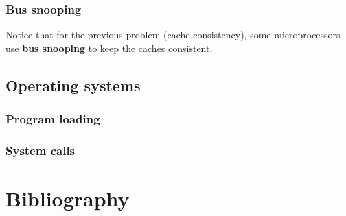 
\begin{frame}
  \frametitle{Bus snooping}

  Notice that for the previous problem (cache consistency), some
  microprocessors use \textbf{bus snooping} to keep the caches
  consistent.

\end{frame}

%
%

\subsection{Operating systems}


\begin{frame}
  \frametitle{Program loading}

  \begin{center}
  \end{center}

\end{frame}


\begin{frame}
  \frametitle{System calls}

  \begin{center}
  \end{center}

\end{frame}

%
%

\section{Bibliography}

\begin{thebibliography}{4}


\end{thebibliography}

